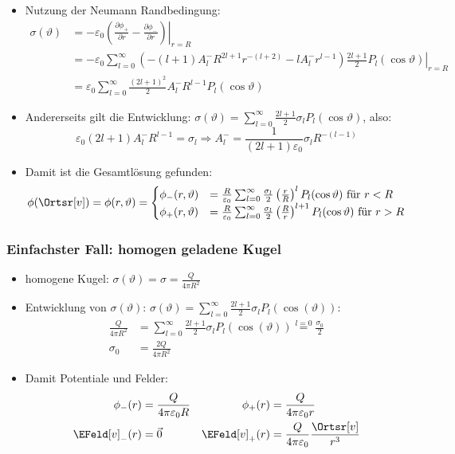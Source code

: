 \begin{frame}
  \begin{itemize}[<+->]
  \item Nutzung der Neumann Randbedingung:
    \begin{align*}
      \sigma(\vartheta) &= -\varepsilon_0 \left.\left( \frac{\partial \phi_+}{\partial r} - \frac{\partial \phi_-}{\partial r}\right)\right|_{r=R} \\
                     & = \left. -\varepsilon_0 \sum_{l=0}^{\infty} \left( -(l+1) A_{l}^- R^{2l+1} r^{-(l+2)}- l A_{l}^- r^{l-1}\right) \frac{2l+1}{2} P_l (\cos\vartheta) \right|_{r=R} \\
      &= \varepsilon_0 \sum_{l=0}^{\infty} \frac{(2l+1)^2}{2} A_{l}^- R^{l-1} P_l (\cos\vartheta) 
    \end{align*}
  \item Andererseits gilt die Entwicklung: $\sigma(\vartheta) = \sum_{l=0}^{\infty}  \frac{2l+1}{2} \sigma_l P_l (\cos\vartheta)$, also:
    $$
    \varepsilon_0 (2l+1) A_{l}^- R^{l-1} = \sigma_l \Rightarrow \boxed{ A_{l}^- = \frac{1}{(2l+1)\varepsilon_0}\sigma_l  R^{-(l-1)}}
    $$
  \item Damit ist die Gesamtlösung gefunden:
    $$
    \phi(\Ortsr[v]) = \phi(r,\vartheta) =
    \begin{cases}
      \phi_-(r,\vartheta) & = \frac{R}{\varepsilon_0} \sum_{l=0}^{\infty} \frac{\sigma_l}{2} \left(\frac{r}{R}\right)^l P_l(\cos\vartheta) \text{ für } r<R\\ 
      \phi_+(r,\vartheta) & = \frac{R}{\varepsilon_0} \sum_{l=0}^{\infty} \frac{\sigma_l}{2} \left(\frac{R}{r}\right)^{l+1} P_l(\cos\vartheta) \text{ für } r>R\\ 
      \end{cases}
    $$
    \end{itemize}
  \end{frame}

 \begin{frame}
   \frametitle{Einfachster Fall: homogen geladene Kugel}
   \begin{itemize}[<+->]
   \item homogene Kugel: $\sigma(\vartheta) = \sigma = \frac{Q}{4\pi R^2}$
   \item Entwicklung von $\sigma(\vartheta)$: $\sigma(\vartheta) = \sum_{l=0}^\infty \frac{2l+1}{2}\sigma_l P_l(\cos(\vartheta))$:
     \begin{align*}
       \frac{Q}{4\pi R^2} & = \sum_{l=0}^\infty \frac{2l+1}{2}\sigma_l P_l(\cos(\vartheta)) \stackrel{l=0}{=} \frac{\sigma_0}{2}\\
       \sigma_0 &= \frac{2Q}{4\pi R^2}
     \end{align*}
   \item Damit Potentiale und Felder:
     \begin{align*}
       \phi_-(r) & = \frac{Q}{4\pi\varepsilon_0 R} & \phi_+(r) & = \frac{Q}{4\pi\varepsilon_0 r}\\
       \EFeld[v]_- (r) &= \vec{0} & \EFeld[v]_+ (r) &= \frac{Q}{4\pi\varepsilon_0} \frac{\Ortsr[v]}{r^3} 
       \end{align*}
     \end{itemize}
\end{frame}  


   
